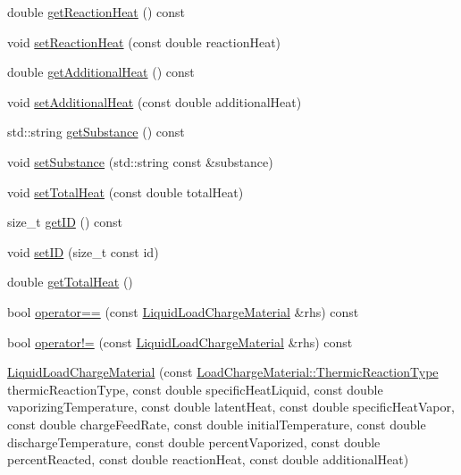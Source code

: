 \begin{DoxyCompactItemize}
\item 
double \hyperlink{class_liquid_load_charge_material_a2f0c26e789e98efd1e8fd0c8741ddd92}{get\+Reaction\+Heat} () const
\item 
void \hyperlink{class_liquid_load_charge_material_a793c7ebc2643b2af0eaf21b9cb788775}{set\+Reaction\+Heat} (const double reaction\+Heat)
\item 
double \hyperlink{class_liquid_load_charge_material_a6b79cd1aec59a7f7119a8abfa9e5859b}{get\+Additional\+Heat} () const
\item 
void \hyperlink{class_liquid_load_charge_material_a557c1f588cfb972ff0c7f748d6c2bd8f}{set\+Additional\+Heat} (const double additional\+Heat)
\item 
std\+::string \hyperlink{class_liquid_load_charge_material_a8f925c04c15ed889ba3fd7c4b628dbff}{get\+Substance} () const
\item 
void \hyperlink{class_liquid_load_charge_material_a85bb43270c6a11a1eaf51f00da16746a}{set\+Substance} (std\+::string const \&substance)
\item 
void \hyperlink{class_liquid_load_charge_material_ad45afc317b72c89cc46016e0b05b50b3}{set\+Total\+Heat} (const double total\+Heat)
\item 
size\+\_\+t \hyperlink{class_liquid_load_charge_material_a07e869cabd98a5179536559a1c0f4b35}{get\+ID} () const
\item 
void \hyperlink{class_liquid_load_charge_material_a3f6654f1d9387366e0ca7620ecc41361}{set\+ID} (size\+\_\+t const id)
\item 
double \hyperlink{class_liquid_load_charge_material_a51a9826325e2c34cd073b8766331d476}{get\+Total\+Heat} ()
\item 
bool \hyperlink{class_liquid_load_charge_material_ad2090d1628f26e46339e9e164b47d3a2}{operator==} (const \hyperlink{class_liquid_load_charge_material}{Liquid\+Load\+Charge\+Material} \&rhs) const
\item 
bool \hyperlink{class_liquid_load_charge_material_aa6ad825ee8ab1c7816ce3bf10260c0bb}{operator!=} (const \hyperlink{class_liquid_load_charge_material}{Liquid\+Load\+Charge\+Material} \&rhs) const
\item 
\hyperlink{class_liquid_load_charge_material_ab6b2ef342701227c60dc380f5a576085}{Liquid\+Load\+Charge\+Material} (const \hyperlink{class_load_charge_material_a51d4263e865a5d86236622dd3fe23fd1}{Load\+Charge\+Material\+::\+Thermic\+Reaction\+Type} thermic\+Reaction\+Type, const double specific\+Heat\+Liquid, const double vaporizing\+Temperature, const double latent\+Heat, const double specific\+Heat\+Vapor, const double charge\+Feed\+Rate, const double initial\+Temperature, const double discharge\+Temperature, const double percent\+Vaporized, const double percent\+Reacted, const double reaction\+Heat, const double additional\+Heat)

\end{DoxyCompactItemize}
